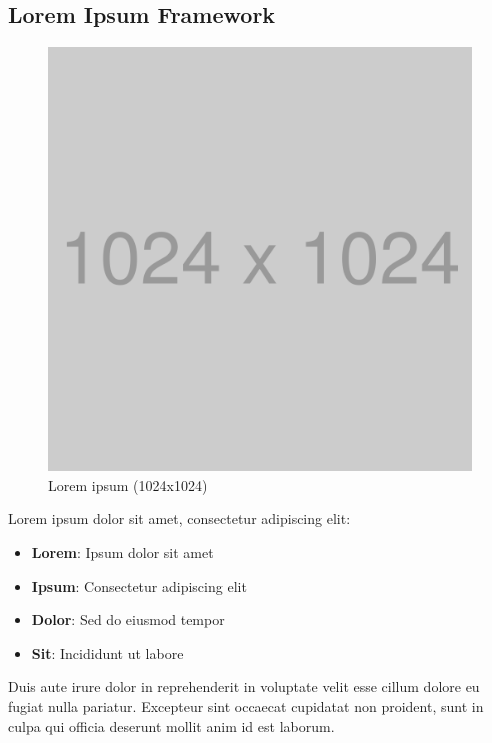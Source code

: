 \subsection*{Lorem Ipsum Framework}

\begin{figure}
	\centering
	\includegraphics[width=\linewidth]{graphics/1024x1024.png}
	\caption{Lorem ipsum (1024x1024)}
\end{figure}

Lorem ipsum dolor sit amet, consectetur adipiscing elit:

\begin{itemize}[noitemsep, topsep=0pt]
	\item \textbf{Lorem}: Ipsum dolor sit amet
	\item \textbf{Ipsum}: Consectetur adipiscing elit
	\item \textbf{Dolor}: Sed do eiusmod tempor
	\item \textbf{Sit}: Incididunt ut labore
\end{itemize}



Duis aute irure dolor in reprehenderit in voluptate velit esse cillum dolore eu fugiat nulla pariatur. Excepteur sint occaecat cupidatat non proident, sunt in culpa qui officia deserunt mollit anim id est laborum.

